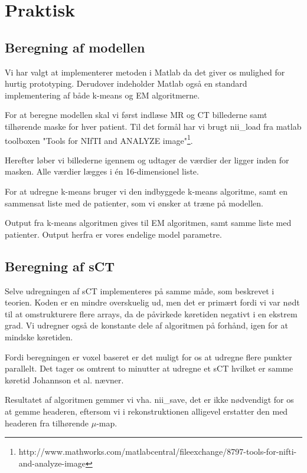 \section{Praktisk}

\subsection{Beregning af modellen}

Vi har valgt at implementerer metoden i Matlab da det giver os mulighed
for hurtig prototyping. Derudover indeholder Matlab også en standard
implementering af både k-means og EM algoritmerne.

For at beregne modellen skal vi først indlæse MR og CT billederne
samt tilhørende maske for hver patient. Til det formål har vi brugt
nii\_load fra matlab toolboxen "Tools for NIfTI and ANALYZE
image"\footnote{http://www.mathworks.com/matlabcentral/fileexchange/8797-tools-for-nifti-and-analyze-image}.

Herefter løber vi billederne igennem og udtager de værdier der ligger
inden for masken. Alle værdier lægges i én 16-dimensionel liste.

For at udregne k-means bruger vi den indbyggede k-means algoritme, samt
en sammensat liste med de patienter, som vi ønsker at træne på
modellen.

Output fra k-means algoritmen gives til EM algoritmen, samt samme liste
med patienter. Output herfra er vores endelige model parametre.

\subsection{Beregning af sCT}

Selve udregningen af sCT implementeres på samme måde, som beskrevet i
teorien. Koden er en mindre overskuelig ud, men det er primært fordi
vi var nødt til at omstrukturere flere arrays, da de påvirkede
køretiden negativt i en ekstrem grad. Vi udregner også de konstante dele
af algoritmen på forhånd, igen for at mindske køretiden.

Fordi beregningen er voxel baseret er det muligt for os at udregne flere
punkter parallelt. Det tager os omtrent to minutter at udregne et sCT
hvilket er samme køretid Johannson et al. nævner.

Resultatet af algoritmen gemmer vi vha. nii\_save, det er ikke
nødvendigt for os at gemme headeren, eftersom vi i rekonstruktionen
alligevel erstatter den med headeren fra tilhørende $\mu$-map.


